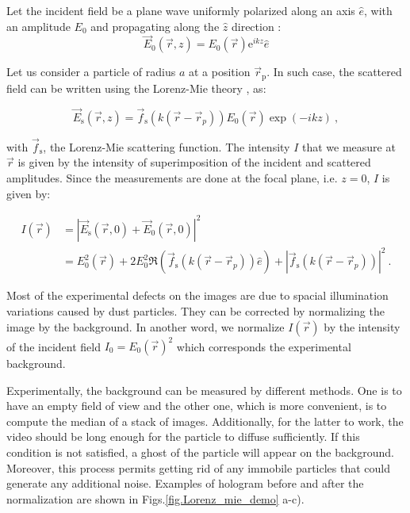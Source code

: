 Let the incident field be a plane wave uniformly polarized along an axis $ \hat{e}$, with an amplitude $E_0$ and propagating along the $\hat{z}$ direction :
\begin{equation}
	\vec{E}_0(\vec{r},z) = E_0(\vec{r}) \mathrm{e}^{ikz}\hat{e}
\end{equation}

Let us consider a particle of radius $a$ at a position $\vec{r}_\mathrm{p} $. In such case, the scattered field can be written using the Lorenz-Mie theory \cite{f_bohren_absorption_1998}, as:

\begin{equation}
	\vec{E}_\mathrm{s}(\vec{r}, z) =  \vec{f}_\mathrm{s}(k(\vec{r} - \vec{r}_p))E_0(\vec{r}) \exp \left(-ikz\right) ~,
	\label{EMie}
\end{equation} 

with $\vec{f}_\mathrm{s}$, the Lorenz-Mie scattering function. The intensity $I$ that we measure at $\vec{r}$ is given by the intensity of superimposition of the incident and scattered amplitudes. Since the measurements are done at the focal plane, i.e. $z = 0 $, $I$ is given by:

\begin{equation}
	\begin{aligned}
		I(\vec{r}) & = |\vec{E}_\mathrm{s}(\vec{r}, 0) + \vec{E}_0(\vec{r}, 0)|^2 \\
		& = E_0^2(\vec{r}) + 2 E_0^2\Re \left(\vec{f}_\mathrm{s}(k(\vec{r}- \vec{r}_p)) \hat{e}\right) + | \vec{f}_\mathrm{s}(k(\vec{r}- \vec{r}_p)) |^2 ~.
	\end{aligned}
\end{equation}

Most of the experimental defects on the images are due to spacial illumination variations caused by dust particles. They can be corrected by normalizing the image by the background. In another word, we normalize $I(\vec{r})$ by the intensity of the incident field $I_0 = E_0(\vec{r})^2$ which corresponds the experimental background. 

Experimentally, the background can be measured by different methods. One is to have an empty field of view and the other one, which is more convenient, is to compute the median of a stack of images. Additionally, for the latter to work, the video should be long enough for the particle to diffuse sufficiently. If this condition is not satisfied, a ghost of the particle will appear on the background. Moreover, this process permits getting rid of any immobile particles that could generate any additional noise. Examples of hologram before and after the normalization are shown in Figs.\ref{fig.Lorenz_mie_demo} a-c).

